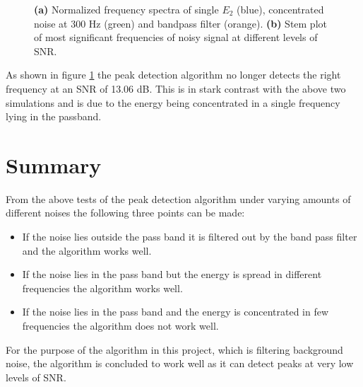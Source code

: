 \begin{figure}[H]
\begin{subfigure}{0.49\textwidth}
\caption{}
\label{fig:concentrated_stem}
\end{subfigure}
\caption{\textbf{(a)} Normalized frequency spectra of single $E_2$ (blue), concentrated noise at 300 Hz (green) and bandpass filter (orange). \textbf{(b)} Stem plot of most significant frequencies of noisy signal at different levels of SNR.}
\label{fig:concentrated_noise}
\end{figure}

As shown in figure \ref{fig:concentrated_stem} the peak detection algorithm no longer detects the right frequency at an SNR of 13.06 dB. This is in stark contrast with the above two simulations and is due to the energy being concentrated in a single frequency lying in the passband.

\section{Summary}
From the above tests of the peak detection algorithm under varying amounts of different noises the following three points can be made:
\begin{itemize}
\item If the noise lies outside the pass band it is filtered out by the band pass filter and the algorithm works well.
\item If the noise lies in the pass band but the energy is spread in different frequencies the algorithm works well.
\item If the noise lies in the pass band and the energy is concentrated in few frequencies the algorithm does not work well.
\end{itemize}
For the purpose of the algorithm in this project, which is filtering background noise, the algorithm is concluded to work well as it can detect peaks at very low levels of SNR.